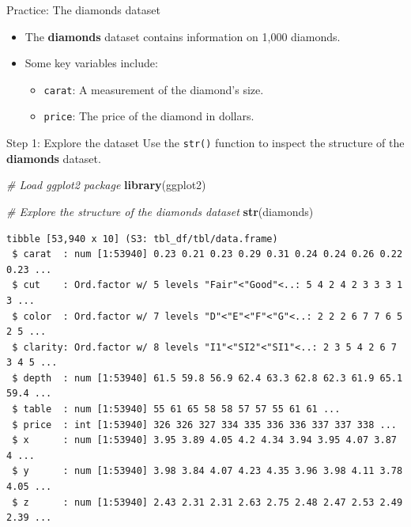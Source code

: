 \documentclass[
  ignorenonframetext,
]{beamer}
\newenvironment{Shaded}{\begin{snugshade}}{\end{snugshade}}
\newcommand{\CommentTok}[1]{\textcolor[rgb]{0.56,0.35,0.01}{\textit{#1}}}
\newcommand{\FunctionTok}[1]{\textcolor[rgb]{0.13,0.29,0.53}{\textbf{#1}}}
\newcommand{\NormalTok}[1]{#1}
\providecommand{\tightlist}{%
  \setlength{\itemsep}{0pt}\setlength{\parskip}{0pt}}
\begin{document}
\begin{frame}[fragile]{Practice: The diamonds dataset}
\label{practice-the-diamonds-dataset}
\begin{itemize}
\tightlist
\item
  The \textbf{diamonds} dataset contains information on 1,000 diamonds.
\item
  Some key variables include:

  \begin{itemize}
  \tightlist
  \item
    \texttt{carat}: A measurement of the diamond's size.
  \item
    \texttt{price}: The price of the diamond in dollars.
  \end{itemize}
\end{itemize}
\end{frame}

\begin{frame}[fragile]{Step 1: Explore the dataset}
\label{step-1-explore-the-dataset}
Use the \texttt{str()} function to inspect the structure of the
\textbf{diamonds} dataset.


\begin{Shaded}
\begin{Highlighting}[]
\CommentTok{\# Load ggplot2 package}
\FunctionTok{library}\NormalTok{(ggplot2)}

\CommentTok{\# Explore the structure of the diamonds dataset}
\FunctionTok{str}\NormalTok{(diamonds)}
\end{Highlighting}
\end{Shaded}

\begin{verbatim}
tibble [53,940 x 10] (S3: tbl_df/tbl/data.frame)
 $ carat  : num [1:53940] 0.23 0.21 0.23 0.29 0.31 0.24 0.24 0.26 0.22 0.23 ...
 $ cut    : Ord.factor w/ 5 levels "Fair"<"Good"<..: 5 4 2 4 2 3 3 3 1 3 ...
 $ color  : Ord.factor w/ 7 levels "D"<"E"<"F"<"G"<..: 2 2 2 6 7 7 6 5 2 5 ...
 $ clarity: Ord.factor w/ 8 levels "I1"<"SI2"<"SI1"<..: 2 3 5 4 2 6 7 3 4 5 ...
 $ depth  : num [1:53940] 61.5 59.8 56.9 62.4 63.3 62.8 62.3 61.9 65.1 59.4 ...
 $ table  : num [1:53940] 55 61 65 58 58 57 57 55 61 61 ...
 $ price  : int [1:53940] 326 326 327 334 335 336 336 337 337 338 ...
 $ x      : num [1:53940] 3.95 3.89 4.05 4.2 4.34 3.94 3.95 4.07 3.87 4 ...
 $ y      : num [1:53940] 3.98 3.84 4.07 4.23 4.35 3.96 3.98 4.11 3.78 4.05 ...
 $ z      : num [1:53940] 2.43 2.31 2.31 2.63 2.75 2.48 2.47 2.53 2.49 2.39 ...
\end{verbatim}
\end{frame}
\end{document}
